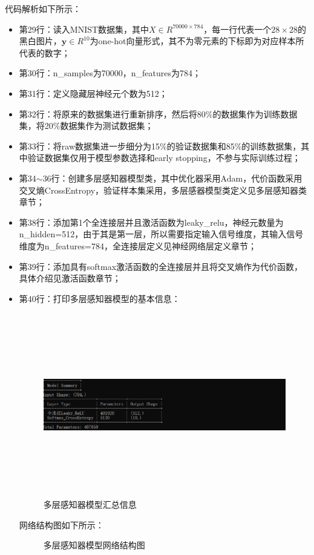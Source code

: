 \documentclass[UTF8]{article}
\begin{document}
代码解析如下所示：
\begin{itemize}
\item 第29行：读入MNIST数据集，其中$X \in R^{70000 \times 784}$，每一行代表一个$28 \times 28$的黑白图片，$\boldsymbol{y} \in R^{10}$为one-hot向量形式，其不为零元素的下标即为对应样本所代表的数字；
\item 第30行：n\_samples为70000，n\_features为784；
\item 第31行：定义隐藏层神经元个数为512；
\item 第32行：将原来的数据集进行重新排序，然后将80\%的数据集作为训练数据集，将20\%数据集作为测试数据集；
\item 第33行：将raw数据集进一步细分为15\%的验证数据集和85\%的训练数据集，其中验证数据集仅用于模型参数选择和early stopping，不参与实际训练过程；
\item 第34$\sim$36行：创建多层感知器模型类，其中优化器采用Adam，代价函数采用交叉熵CrossEntropy，验证样本集采用，多层感器模型类定义见多层感知器类章节；
\item 第38行：添加第1个全连接层并且激活函数为leaky\_relu，神经元数量为n\_hidden=512，由于其是第一层，所以需要指定输入信号维度，其输入信号维度为n\_features=784，全连接层定义见神经网络层定义章节；
\item 第39行：添加具有softmax激活函数的全连接层并且将交叉熵作为代价函数，具体介绍见激活函数章节；
\item 第40行：打印多层感知器模型的基本信息：
\begin{figure}[H]
	\caption{多层感知器模型汇总信息}
	\label{f000062}
	\centering
	\includegraphics[height=8cm]{images/f000062}
\end{figure}
网络结构图如下所示：
\begin{figure}[H]
	\caption{多层感知器模型网络结构图}
	\label{f000063001}
	\centering

\end{figure}
\end{itemize}
\end{document}
